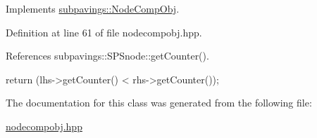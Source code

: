 \-Implements \hyperlink{classsubpavings_1_1NodeCompObj_a121d53049c5ed1c0924313951d6aa630}{subpavings\-::\-Node\-Comp\-Obj}.



\-Definition at line 61 of file nodecompobj.\-hpp.



\-References subpavings\-::\-S\-P\-Snode\-::get\-Counter().


\begin{DoxyCode}
        { return (lhs->getCounter() < rhs->getCounter()); }
\end{DoxyCode}


\-The documentation for this class was generated from the following file\-:\begin{DoxyCompactItemize}
\item 
\hyperlink{nodecompobj_8hpp}{nodecompobj.\-hpp}\end{DoxyCompactItemize}
